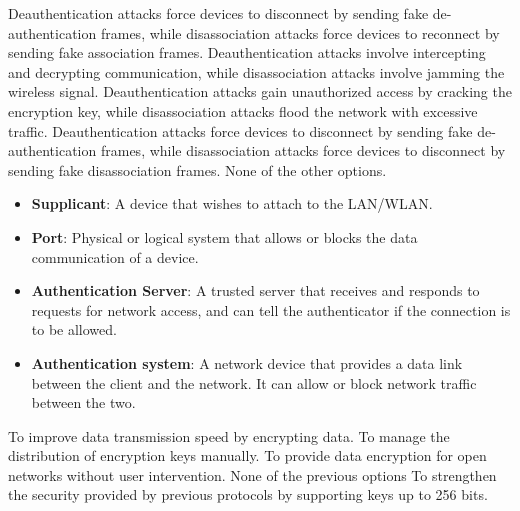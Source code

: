 \begin{checkboxes}
    \choice Deauthentication attacks force devices to disconnect by sending fake de-authentication frames, while disassociation attacks force devices to reconnect by sending fake association frames.
    \choice Deauthentication attacks involve intercepting and decrypting communication, while disassociation attacks involve jamming the wireless signal.
    \choice Deauthentication attacks gain unauthorized access by cracking the encryption key, while disassociation attacks flood the network with excessive traffic.
    \CorrectChoice Deauthentication attacks force devices to disconnect by sending fake de-authentication frames, while disassociation attacks force devices to disconnect by sending fake disassociation frames.
    \choice None of the other options.
\end{checkboxes}

\begin{solution}
    \begin{itemize}
        \item \textbf{Supplicant}: A device that wishes to attach to the LAN/WLAN.
        \item \textbf{Port}: Physical or logical system that allows or blocks the data communication of a device.
        \item \textbf{Authentication Server}: A trusted server that receives and responds to requests for network access, and can tell the authenticator if the connection is to be allowed.
        \item \textbf{Authentication system}: A network device that provides a data link between the client and the network. It can allow or block network traffic between the two.
    \end{itemize}
\end{solution}

\begin{checkboxes}
    \choice To improve data transmission speed by encrypting data.
    \choice To manage the distribution of encryption keys manually.
    \CorrectChoice To provide data encryption for open networks without user intervention.
    \choice None of the previous options
    \choice To strengthen the security provided by previous protocols by supporting keys up to 256 bits.
\end{checkboxes}